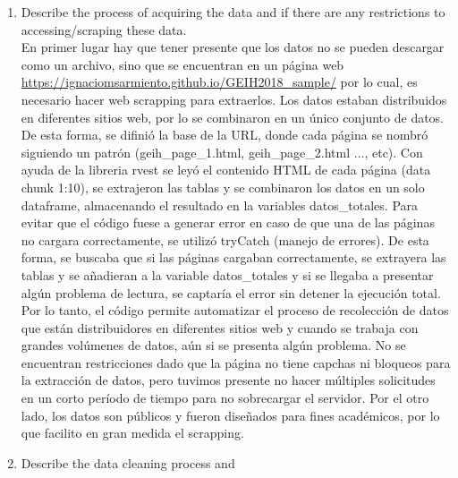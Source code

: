 \documentclass[12pt,a4paper,onecolumn]{article}
\begin{document}
\begin{enumerate}
\begin{enumerate}
    \item Describe the process of acquiring the data and if there are any restrictions to accessing/scraping these data. \\
    
    En primer lugar hay que tener presente que los datos no se pueden descargar como un archivo, sino que se encuentran en un p\'agina web \url{https://ignaciomsarmiento.github.io/GEIH2018_sample/} por lo cual, es necesario hacer web scrapping para extraerlos. Los datos estaban distribuidos en diferentes sitios web, por lo se combinaron en un \'unico conjunto de datos. De esta forma, se difini\'o la base de la URL, donde cada p\'agina se nombr\'o siguiendo un patr\'on (geih\_page\_1.html, geih\_page\_2.html ..., etc). Con ayuda de la libreria rvest se ley\'o el contenido HTML de cada p\'agina (data chunk 1:10), se extrajeron las tablas y se combinaron los datos en un solo dataframe, almacenando el resultado en la variables datos\_totales. Para evitar que el c\'odigo fuese a generar error en caso de que una de las p\'aginas no cargara correctamente, se utiliz\'o tryCatch (manejo de errores). De esta forma, se buscaba que si las p\'aginas cargaban correctamente, se extrayera las tablas y se a\~nadieran a la variable datos\_totales y si se llegaba a presentar alg\'un problema de lectura, se captar\'ia el error sin detener la ejecuci\'on total. Por lo tanto, el c\'odigo permite automatizar el proceso de recolecci\'on de datos que est\'an distribuidores en diferentes sitios web y cuando se trabaja con grandes vol\'umenes de datos, a\'un si se presenta alg\'un problema. No se encuentran restricciones dado que la p\'agina no tiene capchas ni bloqueos para la extracci\'on de datos, pero tuvimos presente no hacer m\'ultiples solicitudes en un corto per\'iodo de tiempo para no sobrecargar el servidor. Por el otro lado, los datos son p\'ublicos y fueron dise\~nados para fines acad\'emicos, por lo que facilito en gran medida el scrapping.




    
    \item Describe the data cleaning process and \\
    

\end{enumerate}
\end{enumerate}
\end{document}
